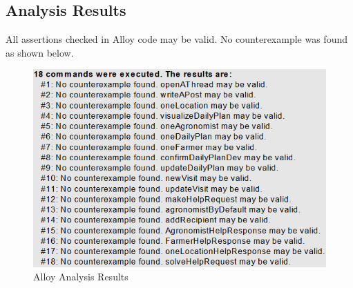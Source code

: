\subsection{Analysis Results}

All assertions checked in Alloy code may be valid. No counterexample was found as shown below.

\begin{figure}[H]
  \includegraphics[width=\textwidth,height=\textheight,keepaspectratio]{./Images/Alloy/assertionsExecution.png}
  \caption{Alloy Analysis Results}
\end{figure}